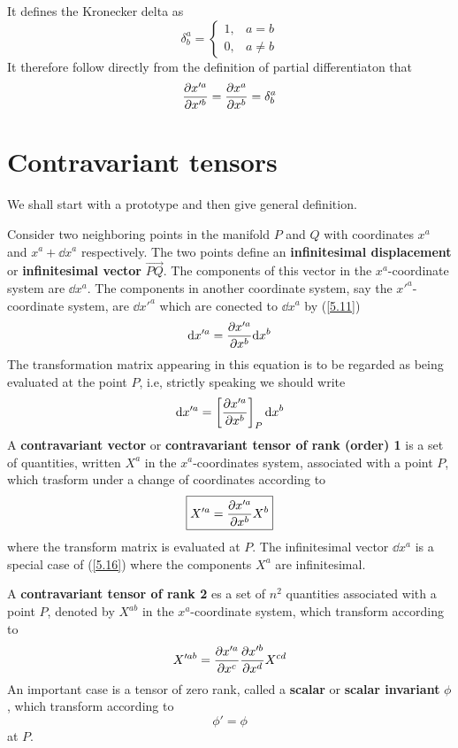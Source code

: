 It defines the Kronecker delta as
\begin{equation}
  \delta_b^{a}=\left\{ \begin{array}{lc}
    1 ,& a=b\\
  0 ,& a\neq b\end{array}\right.
\end{equation}
It therefore follow directly from the definition of partial differentiaton that
\begin{equation}                                \label{5.13}
  \pdv{x'^{a}}{x'^b}=\pdv{x^{a}}{x^b}=\delta_b^{a}
\end{equation}

\section{Contravariant tensors}
We shall start with a prototype and then give general definition.

Consider two neighboring points in the manifold $P$ and $Q$ with coordinates $x^{a}$ and $x^{a}+\dd x^{a}$  respectively. The two points define an \textbf{infinitesimal displacement} or \textbf{infinitesimal vector} $\overrightarrow{PQ}$. The components of this vector in the $x^{a}$-coordinate system are $\dd x^{a}$. The components in another coordinate system, say the $x'^{a}$-coordinate system, are $\dd x'^{a}$ which are conected to $\dd x^{a}$ by (\ref{5.11})
\begin{equation}\label{4.14}
  \dd x'^{a}=\pdv{x'^{a}}{x^b}\dd x^b
\end{equation}
The transformation matrix appearing in this equation is to be regarded as being evaluated at the point $P$, i.e, strictly speaking we should write 
\begin{equation}\label{5.15}
  \dd x'^{a}=\left[\pdv{x'^{a}}{x^b}\right]_P\dd x^b 
\end{equation}
A \textbf{contravariant vector} or \textbf{contravariant tensor of rank (order) 1} is a set of quantities, written $X^{a}$ in the $x^{a}$-coordinates system, associated with a point $P$, which trasform under a change of coordinates according to
\begin{equation}\label{5.16}
  \boxed{X'^{a}=\pdv{x'^{a}}{x^b}X^b }
\end{equation}
where the transform matrix is evaluated at $P$. The infinitesimal vector $\dd x^{a}$ is a special case of (\ref{5.16}) where the components $X^{a}$ are infinitesimal. 

A \textbf{contravariant tensor of rank 2} es a set of $n^2$ quantities associated with a point $P$, denoted by $X^{ab}$ in the $x^{a}$-coordinate system, which transform according to 
\begin{equation}\label{5.17}
  X'^{ab}=\pdv{x'^{a}}{x^c}\pdv{x'^b}{x^d}X^{cd }
\end{equation}
An important case is a tensor of zero rank, called a \textbf{scalar} or \textbf{scalar invariant} $\phi$, which transform according to 
\begin{equation}\label{5.18}
  \boxed{\phi' =\phi}
\end{equation}
at $P$.

